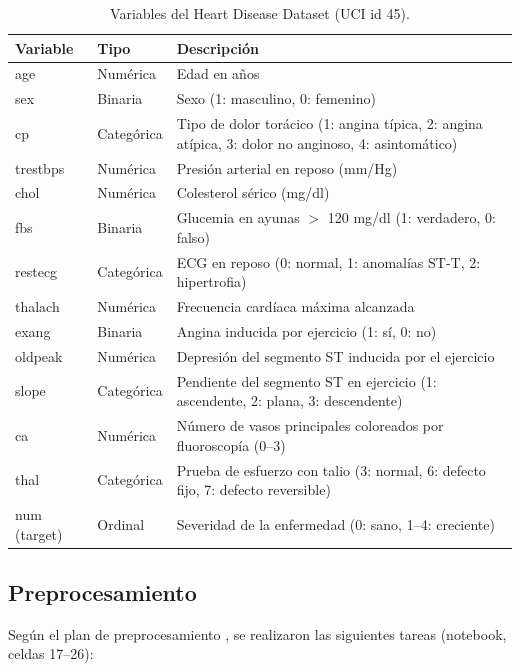 \documentclass[11pt,a4paper]{article}
\begin{document}
\begin{table}[H]
  \centering
  \caption{Variables del Heart Disease Dataset (UCI id 45).}
  \label{tab:variables}
  \small
  \begin{tabular}{@{}llp{8.3cm}@{}}
    \toprule
    \textbf{Variable} & \textbf{Tipo} & \textbf{Descripción} \\
    \midrule
    age & Numérica & Edad en años \\
    sex & Binaria & Sexo (1: masculino, 0: femenino) \\
    cp & Categórica & Tipo de dolor torácico (1: angina típica, 2: angina atípica, 3: dolor no anginoso, 4: asintomático) \\
    trestbps & Numérica & Presión arterial en reposo (mm/Hg) \\
    chol & Numérica & Colesterol sérico (mg/dl) \\
    fbs & Binaria & Glucemia en ayunas $>$ 120 mg/dl (1: verdadero, 0: falso) \\
    restecg & Categórica & ECG en reposo (0: normal, 1: anomalías ST-T, 2: hipertrofia) \\
    thalach & Numérica & Frecuencia cardíaca máxima alcanzada \\
    exang & Binaria & Angina inducida por ejercicio (1: sí, 0: no) \\
    oldpeak & Numérica & Depresión del segmento ST inducida por el ejercicio \\
    slope & Categórica & Pendiente del segmento ST en ejercicio (1: ascendente, 2: plana, 3: descendente) \\
    ca & Numérica & Número de vasos principales coloreados por fluoroscopía (0--3) \\
    thal & Categórica & Prueba de esfuerzo con talio (3: normal, 6: defecto fijo, 7: defecto reversible) \\
    num (target) & Ordinal & Severidad de la enfermedad (0: sano, 1--4: creciente) \\
    \bottomrule
  \end{tabular}
\end{table}

\subsection{Preprocesamiento}

Según el plan de preprocesamiento \cite{planificacion}, se realizaron las siguientes tareas
(notebook, celdas 17--26):
\end{document}
